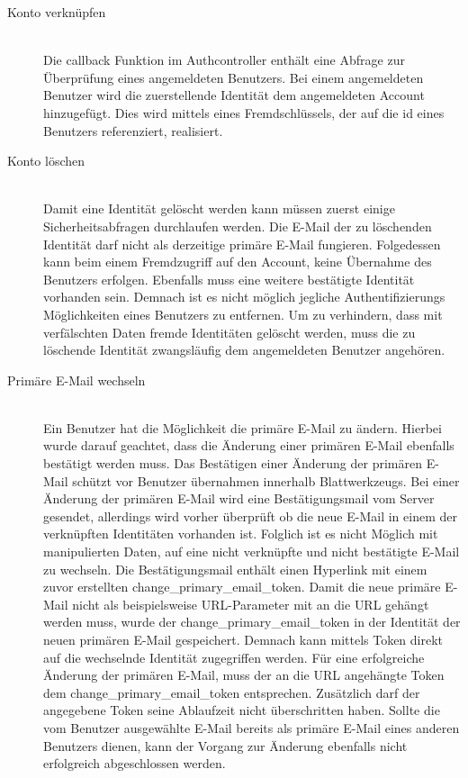 \begin{description}
	\item[Konto verknüpfen]\hfill\\
	Die callback Funktion im Authcontroller enthält eine Abfrage zur Überprüfung eines angemeldeten Benutzers. Bei einem angemeldeten Benutzer wird die zuerstellende Identität dem angemeldeten Account hinzugefügt. Dies wird mittels eines Fremdschlüssels, der auf die id eines Benutzers referenziert, realisiert.
	\item[Konto löschen]\hfill\\
	Damit eine Identität gelöscht werden kann müssen zuerst einige Sicherheitsabfragen durchlaufen werden. Die E-Mail der zu löschenden Identität darf nicht als derzeitige primäre E-Mail fungieren. Folgedessen kann beim einem Fremdzugriff auf den Account, keine Übernahme des Benutzers erfolgen. Ebenfalls muss eine weitere bestätigte Identität vorhanden sein. Demnach ist es nicht möglich jegliche Authentifizierungs Möglichkeiten eines Benutzers zu entfernen. Um zu verhindern, dass mit verfälschten Daten fremde Identitäten gelöscht werden, muss die zu löschende Identität zwangsläufig dem angemeldeten Benutzer angehören.
	\item[Primäre E-Mail wechseln]\hfill\\
	Ein Benutzer hat die Möglichkeit die primäre E-Mail zu ändern. Hierbei wurde darauf geachtet, dass die Änderung einer primären E-Mail ebenfalls bestätigt werden muss. Das Bestätigen einer Änderung der primären E-Mail schützt vor Benutzer übernahmen innerhalb Blattwerkzeugs. Bei einer Änderung der primären E-Mail wird eine Bestätigungsmail vom Server gesendet, allerdings wird vorher überprüft ob die neue E-Mail in einem der verknüpften Identitäten vorhanden ist. Folglich ist es nicht Möglich mit manipulierten Daten, auf eine nicht verknüpfte und nicht bestätigte E-Mail zu wechseln. Die Bestätigungsmail enthält einen Hyperlink mit einem zuvor erstellten change\_primary\_email\_token. Damit die neue primäre E-Mail nicht als beispielsweise URL-Parameter mit an die \gls{URL} gehängt werden muss, wurde der change\_primary\_email\_token in der Identität der neuen primären E-Mail gespeichert. Demnach kann mittels Token direkt auf die wechselnde Identität zugegriffen werden. Für eine erfolgreiche Änderung der primären E-Mail, muss der an die \gls{URL} angehängte Token dem change\_primary\_email\_token entsprechen. Zusätzlich darf der angegebene Token seine Ablaufzeit nicht überschritten haben. Sollte die vom Benutzer ausgewählte E-Mail bereits als primäre E-Mail eines anderen Benutzers dienen, kann der Vorgang zur Änderung ebenfalls nicht erfolgreich abgeschlossen werden.

\end{description}
